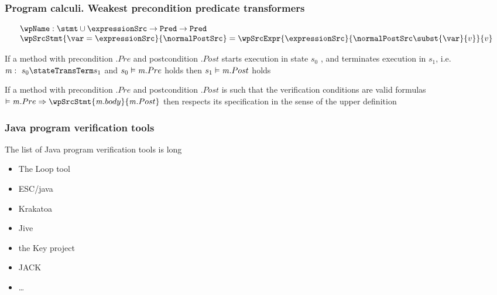 \documentclass{beamer}
\begin{document}
 \begin{frame}[shrink]\frametitle{Program calculi. Weakest precondition  predicate transformers}
   \begin{definition}

   $$ \begin{array}{l} 
       \wpName : \stmt \cup \expressionSrc \rightarrow \Pred   \rightarrow \Pred   \\
       \wpSrcStmt{ \var = \expressionSrc}{\normalPostSrc } =  \wpSrcExpr{\expressionSrc}{\normalPostSrc \subst{\var}{v} }{v} \\
    \end{array}
$$
      \end{definition} 

  \begin{definition}
     If a method \methodd{} with precondition  \methodd.$Pre$
        and postcondition \methodd.$Post$ starts execution in state $s_0$ , and terminates execution in $s_1$, i.e.  \ $\methodd: \  s_0  \stateTransTerm s_1 $ 
          and $s_0 \vDash \mbox{\rm\textit{m}}.Pre $ holds    
         then $s_1 \vDash \mbox{\rm\textit{m}}.Post$ holds
       \end{definition}

     \begin{theorem}
        If a method \methodd{} with precondition  \methodd.$Pre$
        and postcondition \methodd.$Post$ is such that 
        the verification conditions are valid formulas 
$ \vDash \methodd.Pre \Rightarrow \wpSrcStmt{\methodd.body}{\methodd.Post } $ 
        then \methodd{} respects its specification in the sense of the upper definition
       \end{theorem}    
   
 \end{frame}


\begin{frame}\frametitle{Java program verification tools}

The list of Java program verification tools is long 
\begin{itemize}
   \item  The Loop tool
     \item ESC/java
       \item Krakatoa
	 \item Jive
	   \item the Key project
	     \item JACK 
	       \item \ldots
\end{itemize}
\end{frame}
\end{document}
